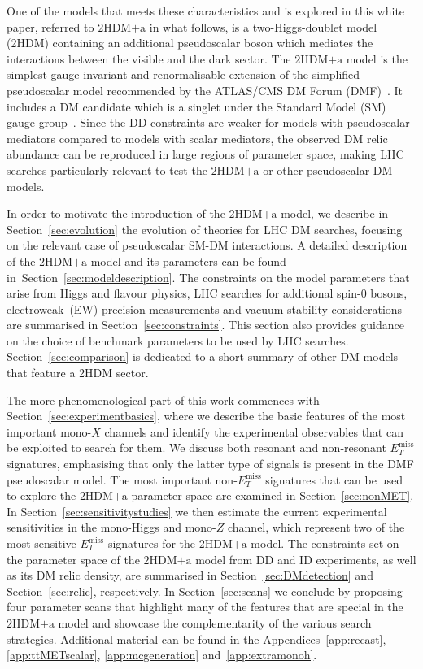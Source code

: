 \documentclass[review]{elsarticle}
\newcommand{\MET}{\ensuremath{E_T^\mathrm{miss}}\xspace}
\newcommand{\hdma}{\ensuremath{\textrm{2HDM+a}}\xspace}
\begin{document}
One of the models that meets these characteristics and is explored in this white paper,  referred to \hdma in what follows,  is a two-Higgs-doublet model (2HDM) containing an additional pseudoscalar boson which mediates the interactions between the visible and the dark sector.  The \hdma model is the simplest gauge-invariant and renormalisable extension of the  simplified pseudoscalar model recommended by the ATLAS/CMS DM Forum (DMF)~\cite{Abercrombie:2015wmb}. It includes a  DM candidate which is a singlet under the Standard Model (SM) gauge group~\cite{Ipek:2014gua,No:2015xqa,Goncalves:2016iyg,Bauer:2017ota,Tunney:2017yfp}.  Since the DD constraints are weaker for models with pseudoscalar mediators compared to models with scalar mediators, the observed DM relic abundance can be reproduced in large regions of parameter space, making LHC searches particularly relevant to test the \hdma or other pseudoscalar DM models.

In order to motivate the introduction of the \hdma model, we describe in Section~\ref{sec:evolution} the evolution of theories for LHC DM searches, focusing on the relevant case of pseudoscalar SM-DM interactions. A detailed description of the \hdma model and its parameters can be found in~Section~\ref{sec:modeldescription}. The constraints on the model parameters that arise from Higgs and flavour physics, LHC searches for additional spin-0 bosons, electroweak~(EW) precision measurements and vacuum stability considerations are summarised in Section~\ref{sec:constraints}. This section also provides guidance on the choice of benchmark parameters to be used by LHC searches. Section~\ref{sec:comparison} is dedicated to a short summary of other DM models that feature a 2HDM sector. 

The more phenomenological part of this work commences with Section~\ref{sec:experimentbasics}, where we describe the basic features of the most important mono-$X$ channels and identify the experimental observables that can be exploited to search for them. We discuss both resonant and non-resonant $\MET$ signatures, emphasising that only the latter type of signals is present in the DMF pseudoscalar model. The most important non-$\MET$ signatures that can be used to explore the \hdma parameter space  are examined in Section~\ref{sec:nonMET}. In Section~\ref{sec:sensitivitystudies} we then estimate the current experimental sensitivities  in the mono-Higgs and mono-$Z$ channel, which represent two of the most sensitive $\MET$ signatures for the \hdma model. The constraints  set on the parameter space of the \hdma model from DD and ID experiments, as well as its DM relic density, are summarised in Section~\ref{sec:DMdetection} and Section~\ref{sec:relic}, respectively. In Section~\ref{sec:scans} we conclude by proposing four parameter scans that highlight many of the features that are special in the \hdma model and showcase the complementarity of the various search strategies.  Additional material can be found in the Appendices~\ref{app:recast}, \ref{app:ttMETscalar}, \ref{app:mcgeneration} and~\ref{app:extramonoh}.
\end{document}
